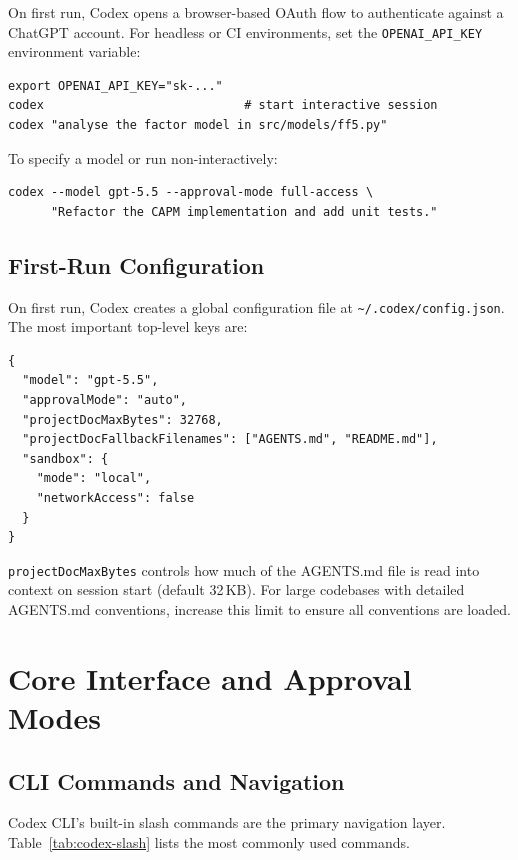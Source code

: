 On first run, Codex opens a browser-based OAuth flow to authenticate against a
ChatGPT account.  For headless or CI environments, set the
\texttt{OPENAI\_API\_KEY} environment variable:

\begin{verbatim}
export OPENAI_API_KEY="sk-..."
codex                            # start interactive session
codex "analyse the factor model in src/models/ff5.py"
\end{verbatim}

To specify a model or run non-interactively:

\begin{verbatim}
codex --model gpt-5.5 --approval-mode full-access \
      "Refactor the CAPM implementation and add unit tests."
\end{verbatim}

\subsection{First-Run Configuration}
\label{app:codex:firstrun}

On first run, Codex creates a global configuration file at
\texttt{\textasciitilde/.codex/config.json}.  The most important top-level
keys are:

\begin{verbatim}
{
  "model": "gpt-5.5",
  "approvalMode": "auto",
  "projectDocMaxBytes": 32768,
  "projectDocFallbackFilenames": ["AGENTS.md", "README.md"],
  "sandbox": {
    "mode": "local",
    "networkAccess": false
  }
}
\end{verbatim}

\texttt{projectDocMaxBytes} controls how much of the AGENTS.md file is read
into context on session start (default 32\,KB).  For large codebases with
detailed AGENTS.md conventions, increase this limit to ensure all conventions
are loaded.

\section{Core Interface and Approval Modes}
\label{app:codex:interface}

\subsection{CLI Commands and Navigation}
\label{app:codex:cli}

Codex CLI's built-in slash commands are the primary navigation layer.
Table~\ref{tab:codex-slash} lists the most commonly used commands.

